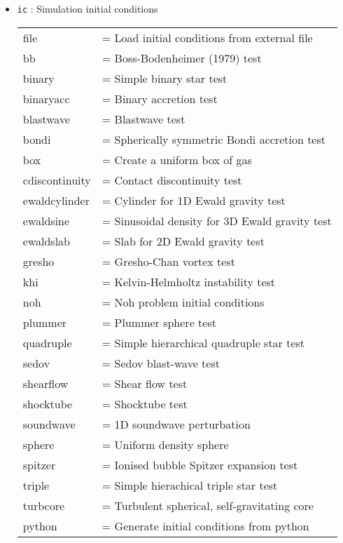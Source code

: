 \documentclass[a4paper]{article}
\newcommand{\var}[1]{\texttt{#1}}
\begin{document}
\begin{itemize}
\item \var{ic} : Simulation initial conditions \vspace{0.1cm} \\
\begin{tabular}{ll}
file              & = Load initial conditions from external file \\
bb                & = Boss-Bodenheimer (1979) test \\
binary            & = Simple binary star test \\
binaryacc         & = Binary accretion test \\
blastwave         & = Blastwave test \\
bondi             & = Spherically symmetric Bondi accretion test \\
box               & = Create a uniform box of gas \\
cdiscontinuity    & = Contact discontinuity test \\
ewaldcylinder     & = Cylinder for 1D Ewald gravity test \\
ewaldsine         & = Sinusoidal density for 3D Ewald gravity test \\
ewaldslab         & = Slab for 2D Ewald gravity test \\
gresho            & = Gresho-Chan vortex test \\
khi               & = Kelvin-Helmholtz instability test \\
noh               & = Noh problem initial conditions \\
plummer           & = Plummer sphere test \\
quadruple         & = Simple hierarchical quadruple star test \\
sedov             & = Sedov blast-wave test \\
shearflow         & = Shear flow test \\
shocktube         & = Shocktube test \\
soundwave         & = 1D soundwave perturbation \\
sphere            & = Uniform density sphere \\
spitzer           & = Ionised bubble Spitzer expansion test \\
triple            & = Simple hierachical triple star test \\
turbcore          & = Turbulent spherical, self-gravitating core \\
python            & = Generate initial conditions from python
\end{tabular}


\end{itemize}
\end{document}
